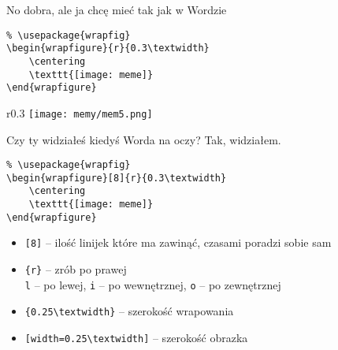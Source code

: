 \documentclass{beamer}
\newcommand{\tb}{\textbackslash}
\begin{document}
\begin{frame}[fragile]{No dobra, ale ja chcę mieć tak jak w Wordzie}{}



    \begin{verbatim}
% \usepackage{wrapfig}
\begin{wrapfigure}{r}{0.3\textwidth}
    \centering
    \texttt{[image: meme]}
\end{wrapfigure}
    \end{verbatim}
    
    \begin{wrapfigure}[8]{r}{0.3\textwidth}
    \centering
    \texttt{[image: memy/mem5.png]}
\end{wrapfigure}%


\end{frame}

\begin{frame}[fragile]{Czy ty widziałeś kiedyś Worda na oczy?}{}
    Tak, widziałem.\pause

    \begin{verbatim}
% \usepackage{wrapfig}
\begin{wrapfigure}[8]{r}{0.3\textwidth}
    \centering
    \texttt{[image: meme]}
\end{wrapfigure}
    \end{verbatim}
    
    \begin{itemize}[<+->]
        \item{} \texttt{[8]} -- ilość linijek które ma zawinąć, czasami poradzi sobie sam
        \item \texttt{\{r\}} -- zrób po prawej\\
        \texttt{l} -- po lewej,
        \texttt{i} -- po wewnętrznej,
        \texttt{o} -- po zewnętrznej
        \item \texttt{\{0.25\tb{}textwidth\}} -- szerokość wrapowania
        \item \texttt{[width=0.25\tb{}textwidth]} -- szerokość obrazka
        
    \end{itemize}
    
    
\end{frame}
\end{document}

